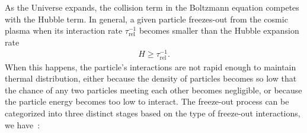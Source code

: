 As the Universe expands, the collision term in the Boltzmann equation competes with the Hubble term. In general, a given particle freezes-out from the cosmic plasma when its interaction rate $\tau_\mathrm{rel}^{-1}$ becomes smaller than the Hubble expansion rate
\begin{align}
H\geqslant\tau_\mathrm{rel}^{-1}.
\end{align}
When this happens, the particle's interactions are not rapid enough to maintain thermal distribution, either because the density of particles becomes so low that the chance of any two particles meeting each other becomes negligible, or because the particle energy becomes too low to interact. The freeze-out process can be categorized into three distinct stages based on the type of freeze-out interactions, we have~\cite{Birrell:2012gg,Rafelski:2023emw}:
